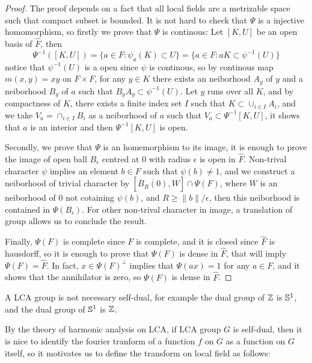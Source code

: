 \begin{proof}
    The proof depends on a fact that all local fields are a metrizable space such that compact subset is bounded. It is not hard to check that \(\Psi\) is a injective homomorphism, so firstly we prove that \(\Psi\) is continous: Let \([K,U]\) be an open basis of \(\hat{F}\), then \[\Psi^{-1}([K,U]) = \{a \in F : \psi_a(K) \subset U\} = \{a \in F : aK \subset \psi^{-1}(U)\}\]
    notice that \( \psi^{-1}(U)\) is a open since \(\psi\) is continous, so by continous map \(m(x,y) = xy\) on \(F\times F\), for any \(y \in K\) there exists an neiborhood \(A_y\) of \(y\) and a neiborhood \(B_y\) of \(a\) such that \(B_yA_y \subset \psi^{-1}(U)\). Let \(y\) runs over all \(K\), and by compactness of \(K\), there exists a finite index set \(I\) such that \(K \subset \cup_{i\in I}A_i\), and we take \(V_a = \cap_{i \in I}B_i\) as a neiborhood of \(a\) such that \(V_a \subset \Psi^{-1}[K,U]\), it shows that \(a\) is an interior and then \(\Psi^{-1}[K,U]\) is open.

    Secondly, we prove that \(\Psi\) is an homemorphism to its image, it is enough to prove the image of open ball \(B_{\epsilon}\) centred at 0 with radius \(\epsilon\) is open in \(\hat{F}\). Non-trival character \(\psi\) implies an element \(b \in F \) such that \(\psi(b) \neq 1\), and we construct a neiborhood of trivial character by \([\overline{B_R(0)},W] \cap \Psi(F)\), where \(W\) is an neiborhood of \(0\) not cotaining \(\psi(b)\), and \(R \geq \|b\|/\epsilon\), then this neiborhood is contained in \(\Psi(B_{\epsilon})\). For other non-trival character in image, a translation of group allows us to conclude the result.

    Finally, \(\Psi(F)\) is complete since \(F\) is complete, and it is closed since \(\hat{F}\) is hausdorff, so it is enough to prove that \(\Psi(F)\) is dense in \(\hat{F}\), that will imply \(\Psi(F) = \hat{F}\). In fact, \( x \in \Psi(F)^\perp \) implies that \(\Psi(ax) = 1\) for any \(a \in F\), and it shows that the annihilator is zero, so \(\Psi(F)\) is dense in \(\hat{F}\).
\end{proof}

\begin{remark}
    A LCA group is not necessary self-dual, for example the dual group of \(\mathbb{Z}\) is \(\mathbb{S}^1\), and the dual group of \(\mathbb{S}^1\) is \(\mathbb{Z}\).
\end{remark}

By the theory of harmonic analysis on LCA, if LCA group \(G\) is self-dual, then it is nice to identify the fourier tranform of a function \(f\) on \(G\) as a function on \(G\) itself, so it motivates us to define the transform on local field as follows:

